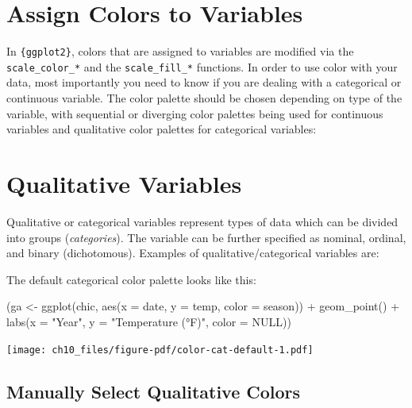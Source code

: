 \documentclass[
  letterpaper,
]{scrbook}
\newenvironment{Shaded}{\begin{snugshade}}{\end{snugshade}}
\newcommand{\AttributeTok}[1]{\textcolor[rgb]{0.40,0.45,0.13}{#1}}
\newcommand{\ConstantTok}[1]{\textcolor[rgb]{0.56,0.35,0.01}{#1}}
\newcommand{\FunctionTok}[1]{\textcolor[rgb]{0.28,0.35,0.67}{#1}}
\newcommand{\NormalTok}[1]{\textcolor[rgb]{0.00,0.23,0.31}{#1}}
\newcommand{\OtherTok}[1]{\textcolor[rgb]{0.00,0.23,0.31}{#1}}
\newcommand{\SpecialCharTok}[1]{\textcolor[rgb]{0.37,0.37,0.37}{#1}}
\newcommand{\StringTok}[1]{\textcolor[rgb]{0.13,0.47,0.30}{#1}}
\begin{document}
\section{Assign Colors to Variables}\label{assign-colors-to-variables}

In \texttt{\{ggplot2\}}, colors that are assigned to variables are
modified via the \texttt{scale\_color\_*} and the
\texttt{scale\_fill\_*} functions. In order to use color with your data,
most importantly you need to know if you are dealing with a categorical
or continuous variable. The color palette should be chosen depending on
type of the variable, with sequential or diverging color palettes being
used for continuous variables and qualitative color palettes for
categorical variables:

\section{Qualitative Variables}\label{qualitative-variables}

Qualitative or categorical variables represent types of data which can
be divided into groups (\emph{categories}). The variable can be further
specified as nominal, ordinal, and binary (dichotomous). Examples of
qualitative/categorical variables are:

The default categorical color palette looks like this:

\begin{Shaded}
\begin{Highlighting}[]
\NormalTok{(ga }\OtherTok{\textless{}{-}} \FunctionTok{ggplot}\NormalTok{(chic, }\FunctionTok{aes}\NormalTok{(}\AttributeTok{x =}\NormalTok{ date, }\AttributeTok{y =}\NormalTok{ temp, }\AttributeTok{color =}\NormalTok{ season)) }\SpecialCharTok{+}
  \FunctionTok{geom\_point}\NormalTok{() }\SpecialCharTok{+}
  \FunctionTok{labs}\NormalTok{(}\AttributeTok{x =} \StringTok{"Year"}\NormalTok{, }\AttributeTok{y =} \StringTok{"Temperature (°F)"}\NormalTok{, }\AttributeTok{color =} \ConstantTok{NULL}\NormalTok{))}
\end{Highlighting}
\end{Shaded}

\texttt{[image: ch10\_files/figure-pdf/color-cat-default-1.pdf]}

\subsection{Manually Select Qualitative
Colors}\label{manually-select-qualitative-colors}
\end{document}
